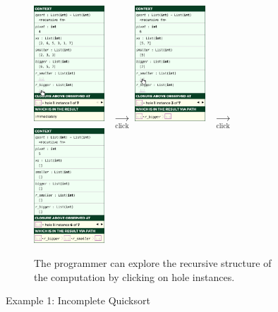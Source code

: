 \begin{figure}[t]
\begin{subfigure}[t]{\textwidth}
\centering
\includegraphics[width=0.29\textwidth,interpolate=false,valign=c]{images/qsort-new-sidebar-1.png}
~$\xrightarrow[\text{click}]{}$
\includegraphics[width=0.29\textwidth,interpolate=false,valign=c]{images/qsort-new-sidebar-2.png}
~$\xrightarrow[\text{click}]{}$
\includegraphics[width=0.29\textwidth,interpolate=false,valign=c]{images/qsort-new-sidebar-3.png}
\caption{The programmer can explore the recursive structure of the computation by clicking on hole instances.}
\label{fig:qsort-sidebars}
\end{subfigure}

\vspace{3px}

\caption{Example 1: Incomplete Quicksort}
\label{fig:qsort-cell-mockup}

\vspace{-8px}
\end{figure}

